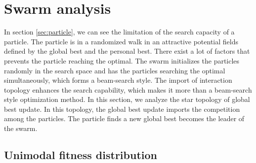 \section{Swarm analysis}
\label{sec:swarm}




In section \ref{sec:particle}, we can see the limitation of the search capacity of a particle.
The particle is in a randomized walk in an attractive potential fields defined by the global best and the personal best.
There exist a lot of factors that prevents the particle reaching the optimal.
The swarm initializes the particles randomly in the search space and has the particles searching the optimal simultaneously, which forms a beam-search style.
The import of interaction topology enhances the search capability, which makes it more than a beam-search style optimization method.
In this section, we analyze the star topology of global best update.
In this topology, the global best update imports the competition among the particles.
The particle finds a new global best becomes the leader of the swarm.

\subsection{Unimodal fitness distribution}


